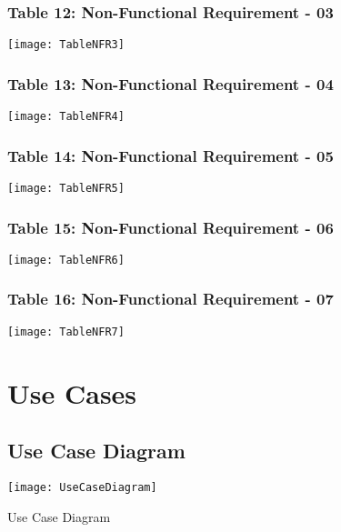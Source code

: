 \begin{figure}[ht]
\subsubsection{Table 12: Non-Functional Requirement - 03}
\centering
\texttt{[image: TableNFR3]}
\end{figure}

\begin{figure}[ht]
\subsubsection{Table 13: Non-Functional Requirement - 04}
\centering
\texttt{[image: TableNFR4]}
\end{figure}

\begin{figure}[ht]
\subsubsection{Table 14: Non-Functional Requirement - 05}
\centering
\texttt{[image: TableNFR5]}
\end{figure}

\begin{figure}[ht]
\subsubsection{Table 15: Non-Functional Requirement - 06}
\centering
\texttt{[image: TableNFR6]}
\end{figure}

\begin{figure}[ht]
\subsubsection{Table 16: Non-Functional Requirement - 07}
\centering
\texttt{[image: TableNFR7]}
\end{figure}
\begin{figure}
\section{Use Cases}
\subsection{Use Case Diagram}
\center
\texttt{[image: UseCaseDiagram]}
\caption{Use Case Diagram}
\label{fig:UseCaseDiagram}
\end{figure}

